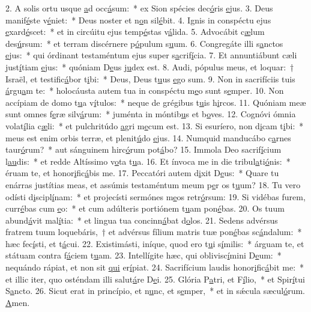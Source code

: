 2. A solis ortu usque \uline{a}d occ\uline{á}sum:~* ex Sion spécies dec\uline{ó}ris \uline{e}jus.
3. Deus manif\uline{é}ste v\uline{é}niet:~* Deus noster et n\uline{o}n sil\uline{é}bit.
4. Ignis in conspéctu ejus \uline{e}xard\uline{é}scet:~* et in circúitu ejus temp\uline{é}stas v\uline{á}lida.
5. Advocábit c\uline{æ}lum des\uline{ú}rsum:~* et terram discérnere p\uline{ó}pulum s\uline{u}um.
6. Congregáte illi s\uline{a}nctos \uline{e}jus:~* qui órdinant testaméntum ejus super s\uline{a}crif\uline{í}cia.
7. Et annuntiábunt cæli just\uline{í}tiam \uline{e}jus:~* quóniam D\uline{e}us j\uline{u}dex est.
8. Audi, pópulus meus, et loquar:~† Israël, et testific\uline{á}bor t\uline{i}bi:~* Deus, Deus t\uline{u}us \uline{e}go sum.
9. Non in sacrifíciis tuis \uline{á}rgu\uline{a}m te:~* holocáusta autem tua in conspéctu m\uline{e}o sunt s\uline{e}mper.
10. Non accípiam de domo t\uline{u}a v\uline{í}tulos:~* neque de grégibus t\uline{u}is h\uline{i}rcos.
11. Quóniam meæ sunt omnes f\uline{e}ræ silv\uline{á}rum:~* juménta in móntib\uline{u}s et b\uline{o}ves.
12. Cognóvi ómnia volat\uline{í}lia c\uline{æ}li:~* et pulchritúdo \uline{a}gri m\uline{e}cum est.
13. Si esuríero, non d\uline{i}cam t\uline{i}bi:~* meus est enim orbis terræ, et plenit\uline{ú}do \uline{e}jus.
14. Numquid manducábo c\uline{a}rnes taur\uline{ó}rum?~* aut sánguinem hirc\uline{ó}rum pot\uline{á}bo?
15. Immola Deo sacrif\uline{í}cium l\uline{au}dis:~* et redde Altíssimo v\uline{o}ta t\uline{u}a.
16. Et ínvoca me in die tribul\uline{a}ti\uline{ó}nis:~* éruam te, et honor\uline{i}fic\uline{á}bis me.
17. Peccatóri autem d\uline{i}xit D\uline{e}us:~* Quare tu enárras justítias meas, et assúmis testaméntum meum p\uline{e}r os t\uline{u}um?
18. Tu vero odísti d\uline{i}scipl\uline{í}nam:~* et projecísti sermónes m\uline{e}os retr\uline{ó}rsum:
19. Si vidébas furem, curr\uline{é}bas cum \uline{e}o:~* et cum adúlteris portiónem t\uline{u}am pon\uline{é}bas.
20. Os tuum abund\uline{á}vit mal\uline{í}tia:~* et lingua tua concinn\uline{á}bat d\uline{o}los.
21. Sedens advérsus fratrem tuum loquebáris,~† et advérsus fílium matris tuæ pon\uline{é}bas sc\uline{á}ndalum:~* hæc fec\uline{í}sti, et t\uline{á}cui.
22. Existimásti, iníque, quod ero t\uline{u}i s\uline{í}milis:~* árguam te, et státuam contra f\uline{á}ciem t\uline{u}am.
23. Intellígite hæc, qui oblivisc\uline{í}mini D\uline{e}um:~* nequándo rápiat, et non sit \uline{qui} er\uline{í}piat.
24. Sacrifícium laudis honor\uline{i}fic\uline{á}bit me:~* et illic iter, quo osténdam illi salut\uline{á}re D\uline{e}i.
25. Glória P\uline{a}tri, et F\uline{í}lio,~* et Spir\uline{í}tui S\uline{a}ncto.
26. Sicut erat in princípio, et n\uline{u}nc, et s\uline{e}mper,~* et in sǽcula sæcul\uline{ó}rum. \uline{A}men.
